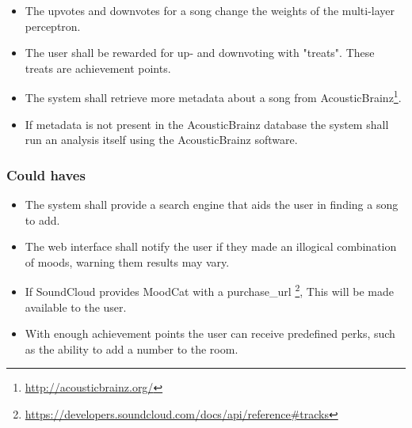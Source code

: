 \begin{itemize}
\item The upvotes and downvotes for a song change the weights of the multi-layer perceptron.

\item The user shall be rewarded for up- and downvoting with "treats". These treats are achievement points.

\item The system shall retrieve more metadata about a song from AcousticBrainz\footnote{\url{http://acousticbrainz.org/}}.

\item If metadata is not present in the AcousticBrainz database the system shall run an analysis itself using the AcousticBrainz software.

\end{itemize}

\subsubsection{Could haves}
\begin{itemize}
\item The system shall provide a search engine that aids the user in finding a song to add.

\item The web interface shall notify the user if they made an illogical combination of moods, warning them results may vary.

\item If SoundCloud provides MoodCat with a purchase\_url \footnote{\url{https://developers.soundcloud.com/docs/api/reference\#tracks}}, This will be made available to the user.

\item With enough achievement points the user can receive predefined perks, such as the ability to add a number to the room.


\end{itemize}

